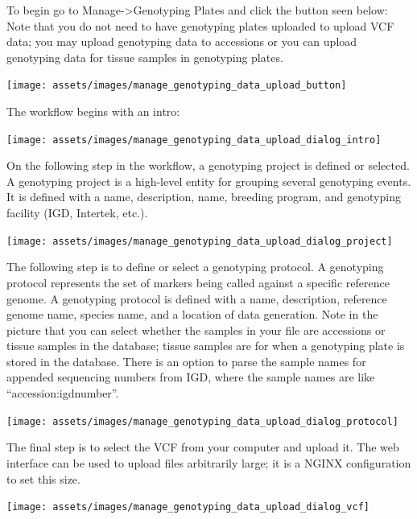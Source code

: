 \documentclass[
  12pt,
]{book}
\begin{document}
To begin go to Manage-\textgreater Genotyping Plates and click the button seen below: Note that you do not need to have genotyping plates uploaded to upload VCF data; you may upload genotyping data to accessions or you can upload genotyping data for tissue samples in genotyping plates.

\begin{center}\texttt{[image: assets/images/manage\_genotyping\_data\_upload\_button]} \end{center}

The workflow begins with an intro:

\begin{center}\texttt{[image: assets/images/manage\_genotyping\_data\_upload\_dialog\_intro]} \end{center}

On the following step in the workflow, a genotyping project is defined or selected. A genotyping project is a high-level entity for grouping several genotyping events. It is defined with a name, description, name, breeding program, and genotyping facility (IGD, Intertek, etc.).

\begin{center}\texttt{[image: assets/images/manage\_genotyping\_data\_upload\_dialog\_project]} \end{center}

The following step is to define or select a genotyping protocol. A genotyping protocol represents the set of markers being called against a specific reference genome. A genotyping protocol is defined with a name, description, reference genome name, species name, and a location of data generation. Note in the picture that you can select whether the samples in your file are accessions or tissue samples in the database; tissue samples are for when a genotyping plate is stored in the database. There is an option to parse the sample names for appended sequencing numbers from IGD, where the sample names are like ``accession:igdnumber''.

\begin{center}\texttt{[image: assets/images/manage\_genotyping\_data\_upload\_dialog\_protocol]} \end{center}

The final step is to select the VCF from your computer and upload it. The web interface can be used to upload files arbitrarily large; it is a NGINX configuration to set this size.

\begin{center}\texttt{[image: assets/images/manage\_genotyping\_data\_upload\_dialog\_vcf]} \end{center}
\end{document}
